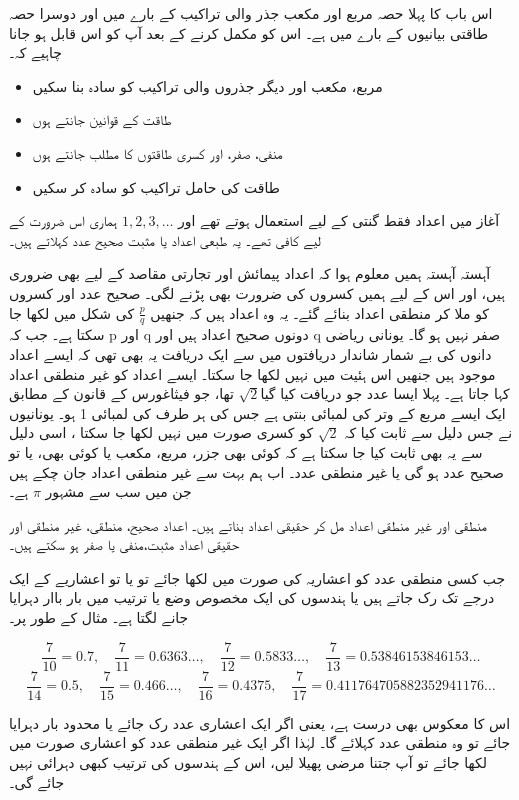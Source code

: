 

اس باب کا پہلا حصہ مربع اور مکعب جذر والی تراکیب کے بارے میں اور دوسرا حصہ طاقتی بیانیوں کے بارے میں ہے۔ اس کو مکمل کرنے کے بعد آپ کو اس قابل ہو جانا چاہیے کہ۔ 
\begin{itemize}
\item
مربع، مکعب اور دیگر جذروں والی تراکیب کو سادہ بنا سکیں
\item
طاقت کے قوانین جانتے ہوں
\item
منفی، صفر، اور کسری طاقتوں کا مطلب جانتے ہوں
\item
طاقت کی حامل تراکیب کو سادہ کر سکیں
\end{itemize}
آغاز میں اعداد فقط گنتی کے لیے استعمال ہوتے تھے اور \(1,2,3,\dotsc\) ہماری اس ضرورت کے لیے کافی تھے۔ یہ طبعی اعداد یا مثبت صحیح عدد کہلاتے ہیں۔ 

آہستہ آہستہ ہمیں معلوم ہوا کہ اعداد پیمائش اور تجارتی مقاصد کے لیے بھی ضروری ہیں، اور اس کے لیے ہمیں کسروں کی ضرورت بھی پڑنے لگی۔ صحیح عدد اور کسروں کو ملا کر منطقی اعداد بنائے گئے۔ یہ وہ اعداد ہیں کہ جنھیں \(\frac{p}{q}\) کی شکل میں لکھا جا سکتا ہے۔ جب کہ p اور q  دونوں صحیح اعداد ہیں اور q صفر نہیں ہو گا۔
یونانی ریاضی دانوں کی بے شمار شاندار دریافتوں میں سے ایک دریافت یہ بھی تھی کہ ایسے اعداد موجود ہیں جنھیں اس ہئیت میں نہیں لکھا جا سکتا۔ ایسے اعداد کو غیر منطقی اعداد کہا جاتا ہے۔ پہلا ایسا عدد جو دریافت کیا گیا\(\sqrt{2}\) تھا، جو فیثاغورس کے قانون کے مطابق ایک ایسے مربع کے وتر کی لمبائی بنتی ہے جس کی ہر طرف کی لمبائی 1 ہو۔ یونانیوں نے جس دلیل سے ثابت کیا کہ \(\sqrt{2}\) کو کسری صورت میں نہیں لکھا جا سکتا ، اسی دلیل سے یہ بھی ثابت کیا جا سکتا ہے کہ کوئی بھی جزر، مربع، مکعب یا کوئی بھی، یا تو صحیح عدد ہو گی یا غیر منطقی عدد۔ اب ہم بہت سے غیر منطقی اعداد جان چکے ہیں جن میں سب سے مشہور \(\pi\) ہے۔

منطقی اور غیر منطقی اعداد مل کر حقیقی اعداد بناتے ہیں۔ اعداد صحیح، منطقی، غیر منطقی اور حقیقی اعداد مثبت،منفی یا صفر ہو سکتے ہیں۔

جب کسی منطقی عدد کو اعشاریہ کی صورت میں لکھا جائے تو یا تو اعشاریے کے ایک درجے تک رک جاتے ہیں یا ہندسوں کی ایک مخصوص وضع یا ترتیب میں  بار باار دہرایا جانے لگتا ہے۔  مثال کے طور پر۔ 

\[\frac{7}{10}=0.7,\quad \frac{7}{11}=0.6363\dotsc,\quad\frac{7}{12}=0.5833\dotsc,\quad\frac{7}{13}=0.538 461 538 461 53\dotsc\]
\[\frac{7}{14}=0.5,\quad\frac{7}{15}=0.466\dotsc,\quad\frac{7}{16}=0.4375,\quad\frac{7}{17}=0.411 764 705 882 352941176\dotsc\]

اس کا معکوس بھی درست ہے، یعنی اگر ایک اعشاری عدد رک جائے یا محدود بار دہرایا جائے تو وہ منطقی عدد کہلائے گا۔ لہٰذا اگر ایک غیر منطقی عدد کو اعشاری صورت میں لکھا جائے تو آپ جتنا مرضی پھیلا لیں، اس کے ہندسوں کی ترتیب کبھی دہرائی نہیں جائے گی۔

